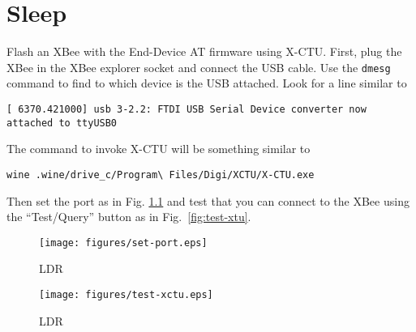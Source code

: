 \chapter{Sleep}
Flash an XBee with the End-Device AT firmware using X-CTU.
First, plug the XBee in the XBee explorer socket and connect the USB cable.
Use the \texttt{dmesg} command to find to which device is the USB attached.
Look for a line similar to

\texttt{[ 6370.421000] usb 3-2.2: FTDI USB Serial Device converter now attached to ttyUSB0}

The command to invoke X-CTU will be something similar to

\texttt{wine .wine/drive\_c/Program{\textbackslash} Files/Digi/XCTU/X-CTU.exe}

Then set the port as in Fig. \ref{fig:set-port} and test that you can connect to the XBee using the ``Test/Query'' button as in Fig.~\ref{fig:test-xtu}.
\begin{figure}[htbp]
  \centering
  \texttt{[image: figures/set-port.eps]}
  \caption{LDR}
  \label{fig:set-port}
\end{figure}

\begin{figure}[htbp]
  \centering
  \texttt{[image: figures/test-xctu.eps]}
  \caption{LDR}
  \label{fig:test-xctu}
\end{figure}
